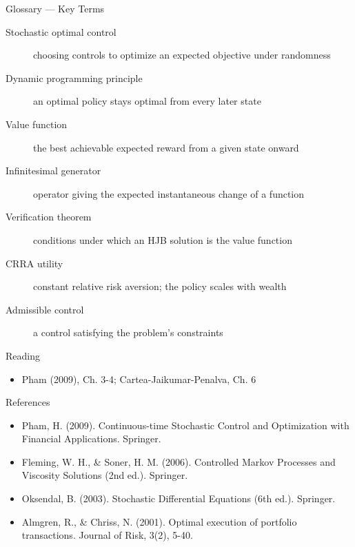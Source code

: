 \documentclass[aspectratio=169,10pt]{beamer}
\begin{document}
\begin{frame}{Glossary --- Key Terms}
\footnotesize\begin{description}
\item[\color{ncsured}Stochastic optimal control] choosing controls to optimize an expected objective under randomness
\item[\color{ncsured}Dynamic programming principle] an optimal policy stays optimal from every later state
\item[\color{ncsured}Value function] the best achievable expected reward from a given state onward
\item[\color{ncsured}Infinitesimal generator] operator giving the expected instantaneous change of a function
\item[\color{ncsured}Verification theorem] conditions under which an HJB solution is the value function
\item[\color{ncsured}CRRA utility] constant relative risk aversion; the policy scales with wealth
\item[\color{ncsured}Admissible control] a control satisfying the problem's constraints
\end{description}
\end{frame}

\begin{frame}{Reading}
\begin{itemize}
  \item Pham (2009), Ch. 3-4; Cartea-Jaikumar-Penalva, Ch. 6
\end{itemize}
\end{frame}

\begin{frame}{References}
\scriptsize\begin{itemize}\setlength{\itemsep}{3pt}
  \item Pham, H. (2009). Continuous-time Stochastic Control and Optimization with Financial Applications. Springer.
  \item Fleming, W. H., \& Soner, H. M. (2006). Controlled Markov Processes and Viscosity Solutions (2nd ed.). Springer.
  \item Oksendal, B. (2003). Stochastic Differential Equations (6th ed.). Springer.
  \item Almgren, R., \& Chriss, N. (2001). Optimal execution of portfolio transactions. Journal of Risk, 3(2), 5-40.
\end{itemize}
\end{frame}
\end{document}
